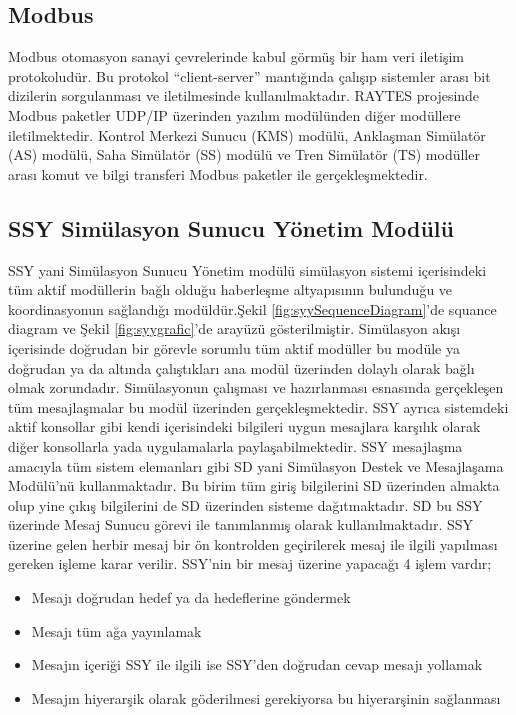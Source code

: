\documentclass[conference]{IEEEtran}
\begin{document}
\subsection{Modbus}
Modbus otomasyon sanayi çevrelerinde kabul görmüş bir ham veri iletişim protokoludür. Bu protokol “client-server” mantığında çalışıp sistemler arası bit dizilerin sorgulanması ve iletilmesinde kullanılmaktadır. RAYTES projesinde Modbus paketler UDP/IP üzerinden yazılım modülünden diğer modüllere iletilmektedir. Kontrol Merkezi Sunucu (KMS) modülü, Anklaşman Simülatör (AS) modülü, Saha Simülatör (SS) modülü ve Tren Simülatör (TS) modüller arası komut ve bilgi transferi Modbus paketler ile gerçekleşmektedir.


\subsection{SSY Simülasyon Sunucu Yönetim Modülü}
SSY yani Simülasyon Sunucu Yönetim modülü simülasyon sistemi içerisindeki tüm aktif modüllerin bağlı olduğu haberleşme altyapısının bulunduğu ve koordinasyonun sağlandığı modüldür.Şekil \ref{fig:syySequenceDiagram}'de squance diagram ve  Şekil \ref{fig:syygrafic}'de arayüzü gösterilmiştir.
Simülasyon akışı içerisinde doğrudan bir görevle sorumlu tüm aktif modüller bu modüle ya doğrudan ya da altında çalıştıkları ana modül üzerinden dolaylı olarak bağlı olmak zorundadır. Simülasyonun çalışması ve hazırlanması esnasında gerçekleşen tüm mesajlaşmalar bu modül üzerinden gerçekleşmektedir.
SSY ayrıca sistemdeki aktif konsollar gibi kendi içerisindeki bilgileri uygun mesajlara karşılık olarak diğer konsollarla yada uygulamalarla paylaşabilmektedir.
SSY mesajlaşma amacıyla tüm sistem elemanları gibi SD yani Simülasyon Destek ve Mesajlaşama Modülü’nü kullanmaktadır. Bu birim tüm giriş bilgilerini SD üzerinden almakta olup yine çıkış bilgilerini de SD üzerinden sisteme dağıtmaktadır. SD bu SSY üzerinde Mesaj Sunucu görevi ile tanımlanmış olarak kullanılmaktadır.
SSY üzerine gelen herbir mesaj bir ön kontrolden geçirilerek mesaj ile ilgili yapılması gereken işleme karar verilir. SSY’nin bir mesaj üzerine yapacağı 4 işlem vardır;

\begin{itemize}
\item Mesajı doğrudan hedef ya da hedeflerine göndermek
\item Mesajı tüm ağa yayınlamak
\item Mesajın içeriği SSY ile ilgili ise SSY’den doğrudan cevap mesajı yollamak
\item Mesajın hiyerarşik olarak göderilmesi gerekiyorsa bu hiyerarşinin sağlanması
\end{itemize}
\end{document}
